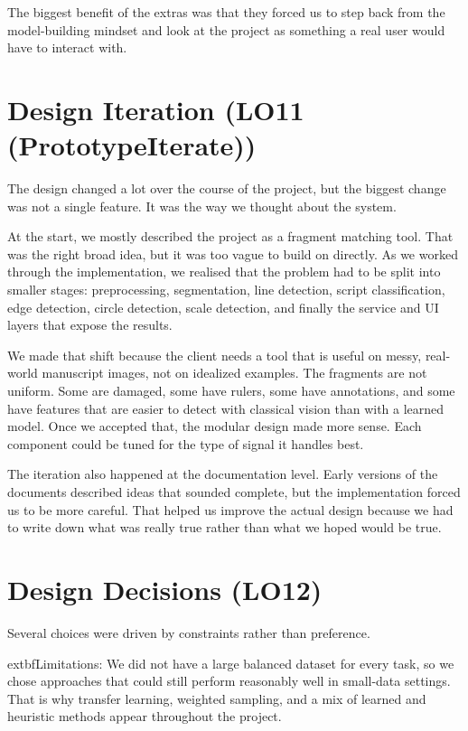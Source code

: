 \documentclass{article}
\begin{document}
The biggest benefit of the extras was that they forced us to step back from the
model-building mindset and look at the project as something a real user would
have to interact with.

\section{Design Iteration (LO11 (PrototypeIterate))}

The design changed a lot over the course of the project, but the biggest change
was not a single feature. It was the way we thought about the system.

At the start, we mostly described the project as a fragment matching tool. That
was the right broad idea, but it was too vague to build on directly. As we worked
through the implementation, we realised that the problem had to be split into
smaller stages: preprocessing, segmentation, line detection, script
classification, edge detection, circle detection, scale detection, and finally
the service and UI layers that expose the results.

We made that shift because the client needs a tool that is useful on messy,
real-world manuscript images, not on idealized examples. The fragments are not
uniform. Some are damaged, some have rulers, some have annotations, and some have
features that are easier to detect with classical vision than with a learned
model. Once we accepted that, the modular design made more sense. Each component
could be tuned for the type of signal it handles best.

The iteration also happened at the documentation level. Early versions of the
documents described ideas that sounded complete, but the implementation forced us
to be more careful. That helped us improve the actual design because we had to
write down what was really true rather than what we hoped would be true.

\section{Design Decisions (LO12)}

Several choices were driven by constraints rather than preference.

	extbf{Limitations:} We did not have a large balanced dataset for every task, so
we chose approaches that could still perform reasonably well in small-data
settings. That is why transfer learning, weighted sampling, and a mix of learned
and heuristic methods appear throughout the project.
\end{document}
